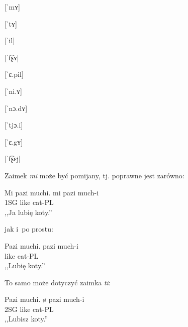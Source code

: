 \begin{spacing}{1.1}
\begin{multicols}{2}

[ˈmʏ]

[ˈtʏ]


[ˈil]

[ˈt͡ʂʏ]

[ˈɛ.pil]

[ˈni.ʏ]

[ˈnɔ.dʏ]

[ˈtjɔ.i]

[ˈɛ.gʏ]

[ˈt͡ʂɛj]

\end{multicols}

\noindent
Zaimek \emph{mi} może być pomijany, tj. poprawne jest zarówno: 

\begin{exe}
	\ex
	\trans Mi pazi muchi.
	\gll  mi pazi much-i \\
	  1SG like cat-PL \\
	\glt  ,,Ja lubię koty.''
\end{exe}

jak i~po prostu:

\begin{exe}
	\ex
	\trans Pazi muchi.
	\gll  pazi much-i \\
	  like cat-PL \\
	\glt  ,,Lubię koty.''
\end{exe}

To samo może dotyczyć zaimka \emph{ti}:

\begin{exe}
	\ex
	\trans Pazi muchi.
	\gll ø pazi much-i \\
	  2SG like cat-PL \\
	\glt  ,,Lubisz koty.''
\end{exe}


\end{spacing}
